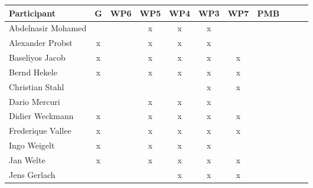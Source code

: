 \documentclass[a4paper, 11pt]{article}
\begin{document}
\begin{tabular}{|l|c|c|c|c||c|c|c||c|c|c|}
\hline
\textbf{Participant}  & \textbf{G} & \textbf{WP6} &  \textbf{WP5} & \textbf{WP4}&  \textbf{WP3} & \textbf{WP7}&  \textbf{PMB} \\\hline
Abdelnasir Mohamed    &  &   & x & x  & x &  &  \\\hline 
Alexander Probst      & x &   & x & x & x &  &   \\\hline  
Baseliyos Jacob       & x &   & x & x & x & x &  \\\hline 
Bernd Hekele          & x &   & x & x & x & x &  \\\hline
Christian Stahl      &   &   &  &  & x & x  &   \\\hline
Dario Mercuri        &  &   & x & x & x &  &   \\\hline
Didier Weckmann      & x &   & x & x & x & x &  \\\hline
Frederique Vallee      & x  &   &  x & x & x & x &  \\\hline
Ingo Weigelt         & x  &   & x & x & x &  &   \\\hline
Jan Welte            & x &   & x & x & x & x &   \\\hline
Jens Gerlach         &   &   &  & x & x &  x &   \\\hline

\end{tabular}
\end{document}
